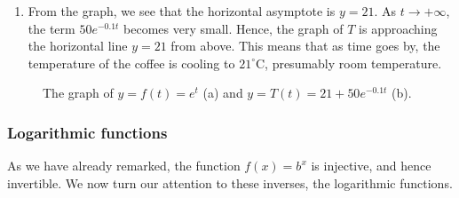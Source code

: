 \begin{example}
\begin{enumerate}
\item  From the graph, we see that the horizontal asymptote is $y = 21$.  As $t \rightarrow +\infty$, the term $50 e^{-0.1t}$ becomes very small.  Hence, the graph of $T$ is approaching the horizontal line $y=21$ from above.  This means that as time goes by, the temperature of the coffee is cooling to $21^{\circ}\mbox{C}$, presumably room temperature.  

\end{enumerate}


\begin{figure}[H]
\centering
\centerline{
\hspace{1cm}
}	
\caption{The graph of $y=f(t)=e^{t}$ (a) and $y=T(t)=21 + 50 e^{-0.1 t}$ (b).}
\end{figure}


\end{example}

\fi 

\subsubsection{Logarithmic functions}

As we have already remarked, the function $f(x) = b^{x}$  is injective, and hence invertible.   We now turn our attention to these inverses, the logarithmic functions.


